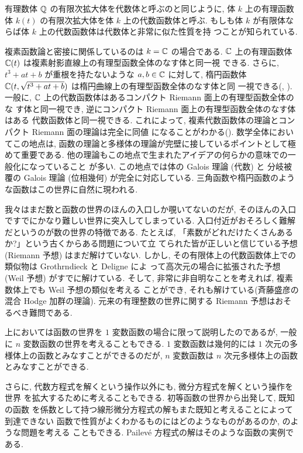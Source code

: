 \documentclass[12pt,twoside]{jarticle}
\begin{document}
有理数体 ${\mathbb Q}$ の有限次拡大体を代数体と呼ぶのと同じように, 
体 $k$ 上の有理函数体 $k(t)$ の有限次拡大体を体 $k$ 上の代数函数体と呼ぶ.
もしも体 $k$ が有限体ならば体 $k$ 上の代数函数体は代数体と非常に似た性質を持
つことが知られている.

複素函数論と密接に関係しているのは $k={\mathbb C}$ の場合である. 
${\mathbb C}$ 上の有理函数体 ${\mathbb C}(t)$ は複素射影直線上の有理型函数全体のなす体と同一視
できる.
さらに, $t^3+at+b$ が重根を持たないような $a,b\in{\mathbb C}$ に対して, 
楕円函数体 ${\mathbb C}(t,\sqrt{t^3+at+b})$ は楕円曲線上の有理型函数全体のなす体と同
一視できる(\cite{takeuchi}, \cite{umemura}).
一般に, ${\mathbb C}$ 上の代数函数体はあるコンパクト Riemann 面上の有理型函数全体のな
す体と同一視でき, 逆にコンパクト Riemann 面上の有理型函数全体のなす体はある
代数函数体と同一視できる. 
これによって, 複素代数函数体の理論とコンパクト Riemann 面の理論は完全に同値
になることがわかる(\cite{iwasawa}).
数学全体においてこの地点は, 
函数の理論と多様体の理論が完壁に接しているポイントとして極めて重要である.
他の理論もこの地点で生まれたアイデアの何らかの意味での一般化になっていること
が多い.
この地点では体の Galois 理論 (代数) と
分岐被覆の Galois 理論 (位相幾何) が完全に対応している.
三角函数や楕円函数のような函数はこの世界に自然に現われる.

我々はまだ数と函数の世界のほんの入口しか覗いてないのだが, 
そのほんの入口ですでにかなり難しい世界に突入してしまっている.
入口付近がおそろしく難解だというのが数の世界の特徴である.
たとえば, 「素数がどれだけたくさんあるか?」という古くからある問題について立
てられた皆が正しいと信じている予想 (Riemann 予想) はまだ解けていない.
しかし, その有限体上の代数函数体上での類似物は Grothrndieck と Deligne によ
って高次元の場合に拡張された予想 (Weil 予想) がすでに解けている.  
そして, 非常に非自明なことを考えれば, 複素数体上でも Weil 予想の類似を考える
ことができ, それも解けている(斉藤盛彦の混合 Hodge 加群の理論).
元来の有理整数の世界に関する Riemann 予想はおそるべき難問である.

上においては函数の世界を $1$ 変数函数の場合に限って説明したのであるが,
一般に $n$ 変数函数の世界を考えることもできる.
$1$ 変数函数は幾何的には $1$ 次元の多様体上の函数とみなすことができるのだが,
$n$ 変数函数は $n$ 次元多様体上の函数とみなすことができる.

さらに, 代数方程式を解くという操作以外にも, 微分方程式を解くという操作を世界
を拡大するために考えることもできる.  初等函数の世界から出発して, 既知の函数
を係数として持つ線形微分方程式の解もまた既知と考えることによって到達できない
函数で性質がよくわかるものにはどのようなものがあるのか, のような問題を考える
こともできる.  Pailev\'e 方程式の解はそのような函数の実例である.
\end{document}
